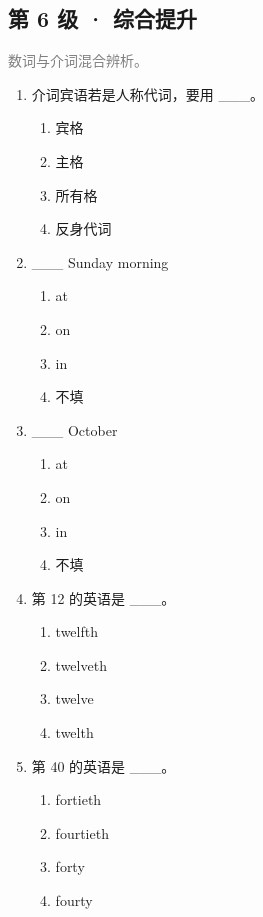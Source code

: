\documentclass[11pt,a4paper]{ctexart}
\begin{document}
\subsection*{第 6 级 · 综合提升}
\noindent\textcolor{gray}{数词与介词混合辨析。}\par\smallskip
\begin{enumerate}[leftmargin=*,itemsep=4pt]
\item 介词宾语若是人称代词，要用 \_\_\_。
\begin{enumerate}[label=\Alph*.,leftmargin=2em,itemsep=1pt,topsep=2pt]
\item 宾格
\item 主格
\item 所有格
\item 反身代词
\end{enumerate}
\item \_\_\_ Sunday morning
\begin{enumerate}[label=\Alph*.,leftmargin=2em,itemsep=1pt,topsep=2pt]
\item at
\item on
\item in
\item 不填
\end{enumerate}
\item \_\_\_ October
\begin{enumerate}[label=\Alph*.,leftmargin=2em,itemsep=1pt,topsep=2pt]
\item at
\item on
\item in
\item 不填
\end{enumerate}
\item 第 12 的英语是 \_\_\_。
\begin{enumerate}[label=\Alph*.,leftmargin=2em,itemsep=1pt,topsep=2pt]
\item twelfth
\item twelveth
\item twelve
\item twelth
\end{enumerate}
\item 第 40 的英语是 \_\_\_。
\begin{enumerate}[label=\Alph*.,leftmargin=2em,itemsep=1pt,topsep=2pt]
\item fortieth
\item fourtieth
\item forty
\item fourty
\end{enumerate}

\end{enumerate}
\end{document}
